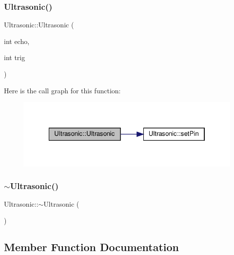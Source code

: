 \subsubsection{\texorpdfstring{Ultrasonic()}{Ultrasonic()}}
{\footnotesize\ttfamily Ultrasonic\+::\+Ultrasonic (\begin{DoxyParamCaption}\item[{int}]{echo,  }\item[{int}]{trig }\end{DoxyParamCaption})}

Here is the call graph for this function\+:
\nopagebreak
\begin{figure}[H]
\begin{center}
\leavevmode
\includegraphics[width=322pt]{classUltrasonic_a306b1ccdce9cc1bfa3ef4a51502e7d44_cgraph}
\end{center}
\end{figure}
\mbox{\label{classUltrasonic_ab5066b2bfeac723140c18b9f8340abad}} 
\subsubsection{\texorpdfstring{$\sim$\+Ultrasonic()}{~Ultrasonic()}}
{\footnotesize\ttfamily Ultrasonic\+::$\sim$\+Ultrasonic (\begin{DoxyParamCaption}{ }\end{DoxyParamCaption})\hspace{0.3cm}{\ttfamily [inline]}}



\subsection{Member Function Documentation}
\mbox{\label{classUltrasonic_a7af95864d8b2b58d56e661e0fcb4ca8b}} 
